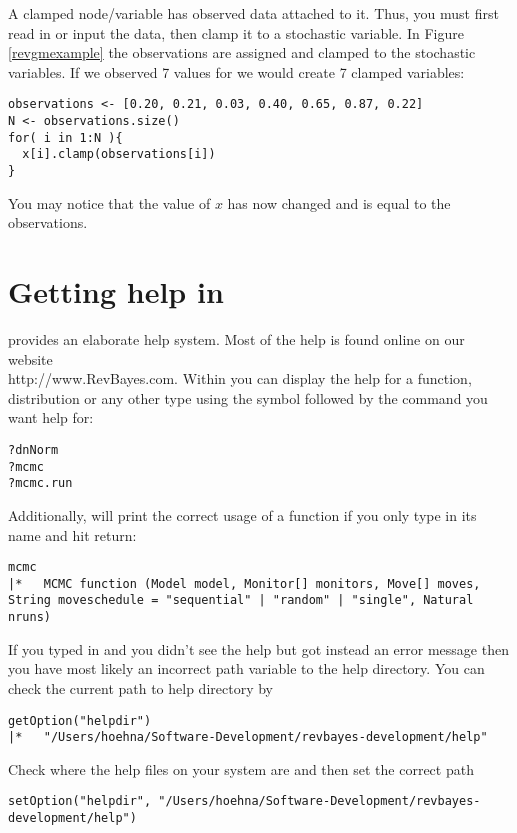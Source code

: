 A clamped node/variable has observed data attached to it. 
Thus, you must first read in or input the data, then clamp it to a stochastic variable. 
In Figure \ref{revgmexample} the observations are assigned and clamped to the stochastic variables.
If we observed 7 values for  we would create 7 clamped variables:
{\tt \begin{snugshade*}
\begin{lstlisting}
observations <- [0.20, 0.21, 0.03, 0.40, 0.65, 0.87, 0.22]
N <- observations.size()
for( i in 1:N ){
  x[i].clamp(observations[i])
}
\end{lstlisting}
\end{snugshade*}}
You may notice that the value of $x$ has now changed and is equal to the observations.



\section{Getting help in \RevBayes}

\RevBayes provides an elaborate help system. 
Most of the help is found online on our website \\
http://www.RevBayes.com.
Within \RevBayes you can display the help for a function, distribution or any other type using the  symbol followed by the command you want help for:
{\tt \begin{snugshade*}
\begin{lstlisting}
?dnNorm
?mcmc
?mcmc.run
\end{lstlisting}
\end{snugshade*}}

Additionally, \RevBayes will print the correct usage of a function if you only type in its name and hit return:
{\tt \small \begin{snugshade*}
\begin{lstlisting}
mcmc
|*   MCMC function (Model model, Monitor[] monitors, Move[] moves, String moveschedule = "sequential" | "random" | "single", Natural nruns)
\end{lstlisting}
\end{snugshade*}}

If you typed in  and you didn't see the help but got instead an error message then you have most likely an incorrect path variable to the help directory.
You can check the current path to help directory by
{\tt \small \begin{snugshade*}
\begin{lstlisting}
getOption("helpdir")
|*   "/Users/hoehna/Software-Development/revbayes-development/help"
\end{lstlisting}
\end{snugshade*}}
Check where the help files on your system are and then set the correct path
{\tt \small \begin{snugshade*}
\begin{lstlisting}
setOption("helpdir", "/Users/hoehna/Software-Development/revbayes-development/help")
\end{lstlisting}
\end{snugshade*}}

